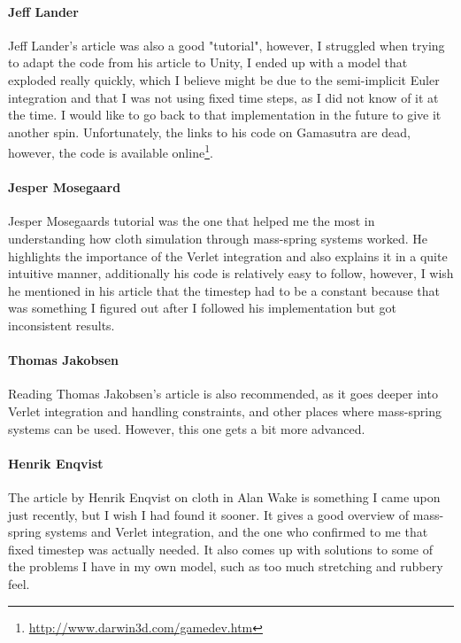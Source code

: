 \paragraph{Jeff Lander} 
Jeff Lander's article was also a good "tutorial", however, I struggled when trying to adapt the code from his article\cite{jeff_lander_real_time_cloth} to Unity,
I ended up with a model that exploded really quickly, which I believe might be due to the semi-implicit Euler integration and that I was not using fixed time steps,
as I did not know of it at the time. I would like to go back to that implementation in the future to give it another spin. 
Unfortunately, the links to his code on Gamasutra are dead, however, the code is available online\footnote{\url{http://www.darwin3d.com/gamedev.htm}}.

\paragraph{Jesper Mosegaard}
Jesper Mosegaards tutorial\cite{mosegaards_clothing_simulation} was the one that helped me the most in understanding how cloth simulation through mass-spring systems worked.
He highlights the importance of the Verlet integration and also explains it in a quite intuitive manner, additionally his code
is relatively easy to follow, however, I wish he mentioned in his article that the timestep had to be a constant because that was something I figured out
after I followed his implementation but got inconsistent results.

\paragraph{Thomas Jakobsen}
Reading Thomas Jakobsen's\cite{jakobsen_advanced_character_physics} article is also recommended, as it goes deeper into Verlet integration and handling constraints,
and other places where mass-spring systems can be used. However, this one gets a bit more advanced.

\paragraph{Henrik Enqvist}
The article by Henrik Enqvist\cite{alan_wake_mass_spring} on cloth in Alan Wake is something I came upon just recently, but I wish I had found it sooner.
It gives a good overview of mass-spring systems and Verlet integration, and the one who confirmed to me that fixed timestep was actually needed.
It also comes up with solutions to some of the problems I have in my own model, such as too much stretching and rubbery feel.

